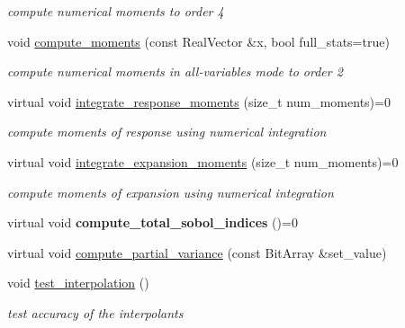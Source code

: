 \begin{DoxyCompactItemize}
\begin{DoxyCompactList}\small\item\em compute numerical moments to order 4 \end{DoxyCompactList}\item 
void \hyperlink{classPecos_1_1InterpPolyApproximation_a2a6098ab4416bdcfdeadea5d46aa5f52}{compute\+\_\+moments} (const Real\+Vector \&x, bool full\+\_\+stats=true)\label{classPecos_1_1InterpPolyApproximation_a2a6098ab4416bdcfdeadea5d46aa5f52}

\begin{DoxyCompactList}\small\item\em compute numerical moments in all-\/variables mode to order 2 \end{DoxyCompactList}\item 
virtual void \hyperlink{classPecos_1_1InterpPolyApproximation_a49382d77eadd7740d024d1d09d42981a}{integrate\+\_\+response\+\_\+moments} (size\+\_\+t num\+\_\+moments)=0\label{classPecos_1_1InterpPolyApproximation_a49382d77eadd7740d024d1d09d42981a}

\begin{DoxyCompactList}\small\item\em compute moments of response using numerical integration \end{DoxyCompactList}\item 
virtual void \hyperlink{classPecos_1_1InterpPolyApproximation_ab67f32d563b7502bdb0c09e076beaa28}{integrate\+\_\+expansion\+\_\+moments} (size\+\_\+t num\+\_\+moments)=0\label{classPecos_1_1InterpPolyApproximation_ab67f32d563b7502bdb0c09e076beaa28}

\begin{DoxyCompactList}\small\item\em compute moments of expansion using numerical integration \end{DoxyCompactList}\item 
virtual void {\bfseries compute\+\_\+total\+\_\+sobol\+\_\+indices} ()=0\label{classPecos_1_1InterpPolyApproximation_a1c4749d8c520c4fefd4f8bb99af67b65}

\item 
virtual void \hyperlink{classPecos_1_1InterpPolyApproximation_a6eb2548a8c786f48478fabb6377be779}{compute\+\_\+partial\+\_\+variance} (const Bit\+Array \&set\+\_\+value)
\item 
void \hyperlink{classPecos_1_1InterpPolyApproximation_a62194c257129acedb670750a372adb1d}{test\+\_\+interpolation} ()\label{classPecos_1_1InterpPolyApproximation_a62194c257129acedb670750a372adb1d}

\begin{DoxyCompactList}\small\item\em test accuracy of the interpolants \end{DoxyCompactList}\end{DoxyCompactItemize}
